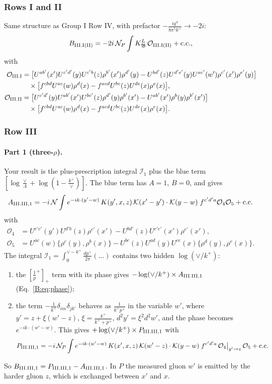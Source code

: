 \documentclass[10pt]{article}
\numberwithin{equation}{section}
\newcommand{\KK}{\mathcal K}
\newcommand{\NN}{\mathcal N}
\newcommand{\NP}{\mathcal N_{P}}
\newcommand{\pp}{p^+}
\begin{document}
\subsubsection{Rows I and II}
Same structure as Group I Row IV, with prefactor $-\frac{ig^4}{8\pi^5k^+}\to-2i$:
\begin{equation}
B_{\rm III.I(II)}=-2i\,\NP\int K^L_{\mathfrak B}\,\mathcal O_{\rm III.I(II)}+{\rm c.c.},
\end{equation}
with
\begin{align*}
\mathcal O_{\rm III.I}&=\big[U^{ab'}(x')U^{c'd'}(y)U^{c'b}(z)\rho^{b'}(x')\rho^{d'}(y)-U^{bd'}(z)U^{d'e'}(y)U^{ac'}(w')\rho^{c'}(x')\rho^{e'}(y)\big]\\
&\quad\times\big[f^{cbd}U^{ac}(w)\rho^d(x)-f^{acd}U^{bc}(z)U^{de}(x)\rho^e(x)\big],\\
\mathcal O_{\rm III.II}&=\big[U^{c'd'}(y)U^{ab'}(x')U^{bc'}(z)\rho^{d'}(y)\rho^{b'}(x')-U^{ab'}(x')\rho^b(y)\rho^{b'}(x')\big]\\
&\quad\times\big[f^{cbd}U^{ac}(w)\rho^d(x)-f^{acd}U^{bc}(z)U^{de}(x)\rho^e(x)\big].
\end{align*}

\subsubsection{Row III}\label{B:sec:G3III}
\paragraph{Part 1 (three-$\rho$).} Your result is the plus-prescription integral $\mathcal I_1$ plus the blue term $[\log\frac{\vee}{\Lambda}+\log(1-\frac{k^+}{\vee})]$. The blue term has $A=1$, $B=0$, and gives
\[
A_{\rm III.III,1}=-i\,\NN\int e^{-ik\cdot(y'-w)}\,K(y',x,z)\,\KK(x'-y')\cdot\KK(y-w)\;f^{c'd'a}\mathcal O_4\mathcal O_5+{\rm c.c.}
\]
with
\begin{align*}
\mathcal O_4&=U^{e'c'}(y')U^{d'b}(z)\rho^{e'}(x')-U^{bd'}(z)U^{c'e'}(x')\rho^{e'}(x'),\\
\mathcal O_5&=U^{ac}(w)\{\rho^c(y),\rho^b(x)\}-U^{bc}(z)U^{ad}(y)U^{ce}(x)\{\rho^d(y),\rho^e(x)\}.
\end{align*} The integral $\mathcal I_1=\int_0^{\vee-k^+}\frac{d\pp}{2\pi}(\dots)$ contains two hidden $\log(\vee/k^+)$:
\begin{enumerate}
\item the $[\frac1\pp]_+$ term with its phase gives $-\log(\vee/k^+)\times A_{\rm III.III,1}$ (Eq.~\eqref{B:eq:phase});
\item the term $-\frac1{k^+}\delta_{im}\delta_{jk'}$ behaves as $\frac{1}{k^+\pp}$ in the variable $w'$, where $y'=z+\xi(w'-z)$, $\xi=\frac{k^+}{k^++\pp}$, $d^2y'=\xi^2d^2w'$, and the phase becomes $e^{-ik\cdot(w'-w)}$. This gives $+\log(\vee/k^+)\times P_{\rm III.III,1}$ with
\[
P_{\rm III.III,1}=-i\,\NP\int e^{-ik\cdot(w'-w)}\,K(x',x,z)\,\KK(w'-z)\cdot\KK(y-w)\;f^{c'd'a}\,\mathcal O_4\big|_{y'\to z}\,\mathcal O_5+{\rm c.c.}
\]
\end{enumerate}
So $B_{\rm III.III,1}=P_{\rm III.III,1}-A_{\rm III.III,1}$. In $P$ the measured gluon $w'$ is emitted by the harder gluon $z$, which is exchanged between $x'$ and $x$.
\end{document}
